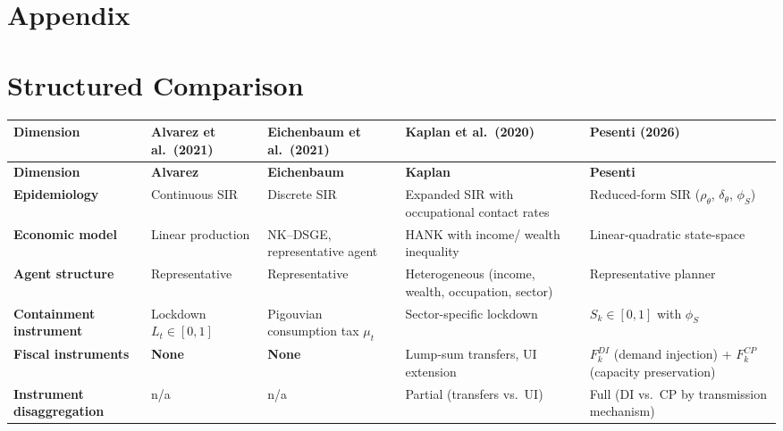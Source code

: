 \documentclass[12pt, a4paper]{article}
\begin{document}
\newpage






\floatbarrier

\newpage
\section{Appendix}

\appendix

\section{Structured Comparison}
\label{app:structured_comp}

\begin{small}
\begin{longtable}{P{3.2cm}P{3cm}P{3cm}P{3cm}P{3cm}}
\toprule
\textbf{Dimension} & \textbf{Alvarez et al.\ (2021)} & \textbf{Eichenbaum et al.\ (2021)} & \textbf{Kaplan et al.\ (2020)} & \textbf{Pesenti (2026)} \\
\midrule
\endfirsthead
\toprule
\textbf{Dimension} & \textbf{Alvarez} & \textbf{Eichenbaum} & \textbf{Kaplan} & \textbf{Pesenti} \\
\midrule
\endhead

\textbf{Epidemiology} & Continuous SIR & Discrete SIR & Expanded SIR with occupational contact rates & Reduced-form SIR ($\rho_\theta$, $\delta_\theta$, $\phi_S$) \\
\midrule

\textbf{Economic model} & Linear production & NK--DSGE, representative agent & HANK with income/ wealth inequality & Linear-quadratic state-space \\
\midrule

\textbf{Agent structure} & Representative & Representative & Heterogeneous (income, wealth, occupation, sector) & Representative planner \\
\midrule

\textbf{Containment instrument} & Lockdown $L_t \in [0,1]$ & Pigouvian consumption tax $\mu_t$ & Sector-specific lockdown & $S_k \in [0,1]$ with $\phi_S$ \\
\midrule

\textbf{Fiscal instruments} & \textbf{None} & \textbf{None} & Lump-sum transfers, UI extension & $F_k^{DI}$ (demand injection) + $F_k^{CP}$ (capacity preservation) \\
\midrule

\textbf{Instrument disaggregation} & n/a & n/a & Partial (transfers vs.\ UI) & Full (DI vs.\ CP by transmission mechanism) \\
\midrule


\end{longtable}
\end{small}
\end{document}
